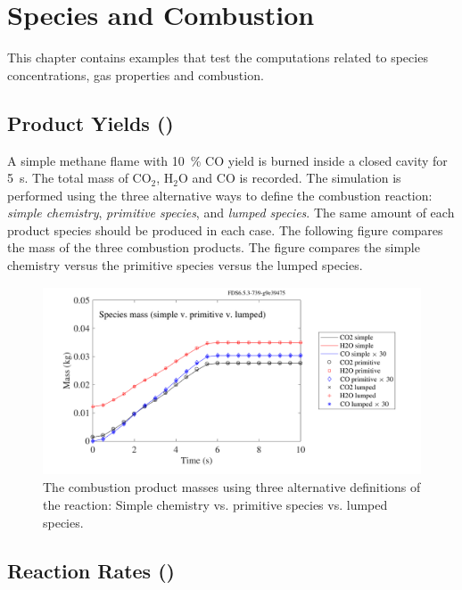 \documentclass[11pt]{book}
\begin{document}
\chapter{Species and Combustion}

This chapter contains examples that test the computations related to species concentrations, gas properties and combustion.



\section{Product Yields (\texorpdfstring{}{methane\_flame})}
\label{methane_flame}

A simple methane flame with 10~\% CO yield is burned inside a closed cavity for 5~s.
The total mass of CO$_2$, H$_2$O and CO is recorded.
The simulation is performed using the three alternative ways
to define the combustion reaction: {\em simple chemistry}, {\em primitive species}, and {\em lumped species}. The
same amount of each product species should be produced in each case. The following figure compares the
mass of the three combustion products. The figure compares the simple chemistry versus the primitive species versus the lumped species.
\begin{figure}[ht]
\centering
\includegraphics[height=2.2in]{SCRIPT_FIGURES/methane_flame_reac_comp}
\caption[Yield of combustion products for alternative reactions]{The combustion product masses using three alternative definitions of the reaction:  Simple chemistry vs. primitive species vs. lumped species. }
\label{fig_methane_flame_yields}
\end{figure}

\clearpage

\section{Reaction Rates (\texorpdfstring{}{reactionrate})}
\end{document}

